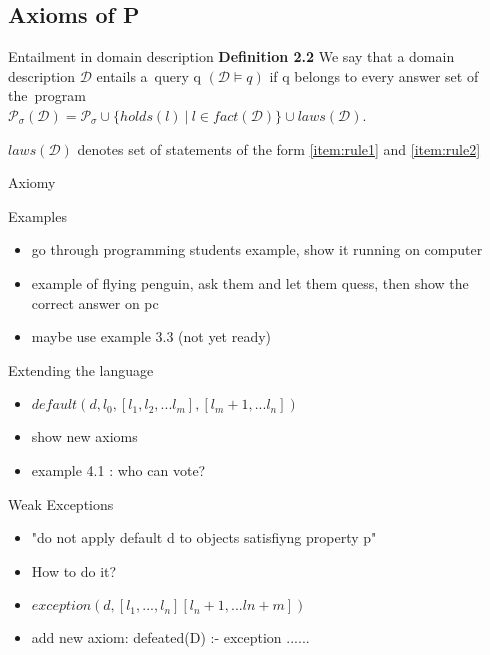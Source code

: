 \documentclass{beamer}
\begin{document}
\subsection{Axioms of P}

\begin{frame}{Entailment in domain description}
  \textbf{Definition 2.2} We say that a domain description $\mathcal{D}$ entails
  a~query q $(\mathcal{D} \models q)$ if q belongs to every answer set
  of the~program \\
  $\mathcal{P}_\sigma(\mathcal{D}) = \mathcal{P}_\sigma \cup \{ holds(l) \ | \ l \in fact(\mathcal{D}) \} \cup laws(\mathcal{D})$. 

  $laws(\mathcal{D})$ denotes set of statements of the form \ref{item:rule1} and \ref{item:rule2}
\end{frame}


\begin{frame}{Axiomy}
\end{frame}


\begin{frame}{Examples}
  \begin{itemize}
    \item go through programming students example, show it running on computer
    \item example of flying penguin, ask them and let them quess,
       then show the correct answer on pc
    \item maybe use example 3.3 (not yet ready)
  \end{itemize}
\end{frame}


\begin{frame}{Extending the language}
  \begin{itemize}
    \item $default(d,l_0,[l_1, l_2, ... l_m], [l_m+1, ... l_n])$
    \item show new axioms
    \item example 4.1 : who can vote?
  \end{itemize}
\end{frame}


\begin{frame}{Weak Exceptions}
  \begin{itemize}
    \item "do not apply default d to objects satisfiyng property p" 
    \item How to do it?
    \item $exception(d, [l_1, ... ,l_n] [l_n+1,...ln+m])$
    \item add new axiom: defeated(D) :- exception ......    
  \end{itemize}
\end{frame}
\end{document}
